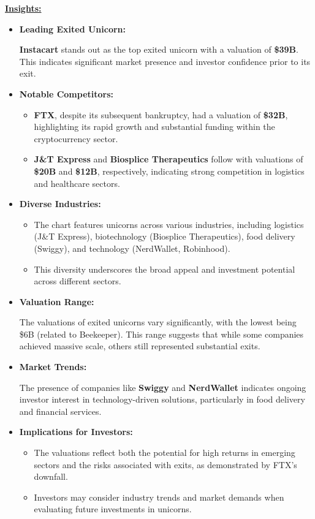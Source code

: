 \documentclass[a4paper,12pt]{article}
\begin{document}
\uline{\textbf{Insights:}}

\begin{itemize}
\item \textbf{Leading Exited Unicorn:}

\textbf{Instacart} stands out as the top exited unicorn with a valuation of \textbf{\$39B}. This indicates significant market presence and investor confidence prior to its exit.

\item \textbf{Notable Competitors:}

\begin{itemize}
\item \textbf{FTX}, despite its subsequent bankruptcy, had a valuation of \textbf{\$32B}, highlighting its rapid growth and substantial funding within the cryptocurrency sector.
\item \textbf{J\&T Express} and \textbf{Biosplice Therapeutics} follow with valuations of \textbf{\$20B} and \textbf{\$12B}, respectively, indicating strong competition in logistics and healthcare sectors.
\end{itemize}

\item \textbf{Diverse Industries:}

\begin{itemize}
\item The chart features unicorns across various industries, including logistics (J\&T Express), biotechnology (Biosplice Therapeutics), food delivery (Swiggy), and technology (NerdWallet, Robinhood).
\item This diversity underscores the broad appeal and investment potential across different sectors.
\end{itemize}

\item \textbf{Valuation Range:}

The valuations of exited unicorns vary significantly, with the lowest being \$6B (related to Beekeeper). This range suggests that while some companies achieved massive scale, others still represented substantial exits.

\item \textbf{Market Trends:}

The presence of companies like \textbf{Swiggy} and \textbf{NerdWallet} indicates ongoing investor interest in technology-driven solutions, particularly in food delivery and financial services.

\item \textbf{Implications for Investors:}

\begin{itemize}
\item The valuations reflect both the potential for high returns in emerging sectors and the risks associated with exits, as demonstrated by FTX's downfall.
\item Investors may consider industry trends and market demands when evaluating future investments in unicorns.
\end{itemize}
\end{itemize}
\end{document}
